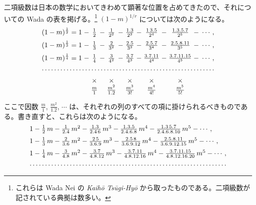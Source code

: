 \documentclass[11pt]{article}
\begin{document}
二項級数は日本の数学においてきわめて顕著な位置を占めてきたので、それについての Wada の表を掲げる。\footnote{これらは Wada Nei の \emph{Kaihō Tsūgi-Hyō} から取ったものである。二項級数が記されている典拠は数多い。} $(1 - m)^{1/r}$ については次のようになる。
\[
\begin{array}{r@{\;}c@{\;}c@{\;}c@{\;}c@{\;}c@{\;}c@{\;}c@{\;}c@{\;}c@{\;}c@{\;}l}
(1-m)^{\frac{1}{2}} = 1 & - & \frac{1}{2} & - & \frac{1}{2^2} & - & \frac{1.3}{2^3} & - & \frac{1\,3.5}{2^4} & - & \frac{1.3.5.7}{2^5} & -\;\cdots,\\[2mm]
(1-m)^{\frac{1}{3}} = 1 & - & \frac{1}{3} & - & \frac{2}{3^2} & - & \frac{2.5}{3^3} & - & \frac{2.5.7}{3^4} & - & \frac{2.5.8.11}{3^5} & -\;\cdots,\\[2mm]
(1-m)^{\frac{1}{4}} = 1 & - & \frac{1}{4} & - & \frac{3}{4^2} & - & \frac{3.7}{4^3} & - & \frac{3.7.11}{4^4} & - & \frac{3.7.11.15}{4^5} & -\;\cdots,\\[1mm]
\hdotsfor{12}\\[2mm]
 & & \times & & \times & & \times & & \times & & \times & \\
 & & \frac{m}{1} & & \frac{m^2}{1.2} & & \frac{m^3}{3!} & & \frac{m^4}{4!} & & \frac{m^5}{5!} &
\end{array}
\]

ここで因数 $\frac{m}{1}$, $\frac{m^2}{1.2}$, $\cdots$ は、それぞれの列のすべての項に掛けられるべきものである。書き直すと、これらは次のようになる。
\[
\begin{array}{l}
1 - \frac{1}{2}\,m - \frac{1}{2.4}\,m^2 - \frac{1.3}{2.4\,6}\,m^3 - \frac{1.3.5}{2.4.6.8}\,m^4 - \frac{1.3\,5.7}{2.4.6.8.10}\,m^5 - \cdots,\\[2mm]
1 - \frac{1}{3}\,m - \frac{2}{3.6}\,m^2 - \frac{2\,5}{3.6.9}\,m^3 - \frac{2.5\,8}{3.6.9.12}\,m^4 - \frac{2.5.8.11}{3.6.9.12.15}\,m^5 - \cdots,\\[2mm]
1 - \frac{1}{4}\,m - \frac{3}{4.8}\,m^2 - \frac{3.7}{4.8.12}\,m^3 - \frac{3.7.11}{4.8.12.16}\,m^4 - \frac{3.7.11.15}{4.8.12.16.20}\,m^5 - \cdots,\\[1mm]
\hdotsfor{1}
\end{array}
\]
\end{document}
